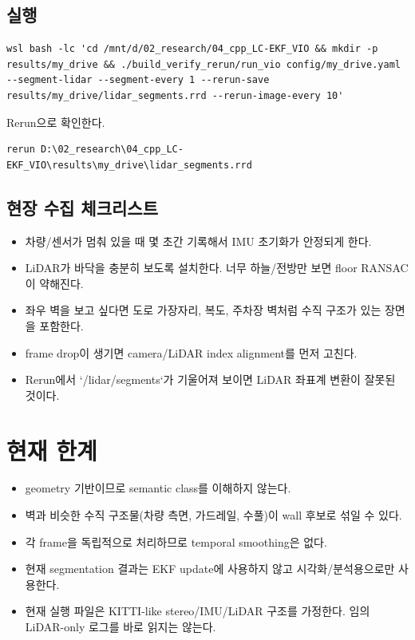 \documentclass[11pt,a4paper,oneside]{report}
\begin{document}
\section{실행}

\begin{lstlisting}
wsl bash -lc 'cd /mnt/d/02_research/04_cpp_LC-EKF_VIO && mkdir -p results/my_drive && ./build_verify_rerun/run_vio config/my_drive.yaml --segment-lidar --segment-every 1 --rerun-save results/my_drive/lidar_segments.rrd --rerun-image-every 10'
\end{lstlisting}

Rerun으로 확인한다.

\begin{lstlisting}
rerun D:\02_research\04_cpp_LC-EKF_VIO\results\my_drive\lidar_segments.rrd
\end{lstlisting}

\section{현장 수집 체크리스트}

\begin{itemize}[leftmargin=2em]
\item 차량/센서가 멈춰 있을 때 몇 초간 기록해서 IMU 초기화가 안정되게 한다.
\item LiDAR가 바닥을 충분히 보도록 설치한다. 너무 하늘/전방만 보면 floor RANSAC이 약해진다.
\item 좌우 벽을 보고 싶다면 도로 가장자리, 복도, 주차장 벽처럼 수직 구조가 있는 장면을 포함한다.
\item frame drop이 생기면 camera/LiDAR index alignment를 먼저 고친다.
\item Rerun에서 `/lidar/segments`가 기울어져 보이면 LiDAR 좌표계 변환이 잘못된 것이다.
\end{itemize}

\chapter{현재 한계}

\begin{itemize}[leftmargin=2em]
\item geometry 기반이므로 semantic class를 이해하지 않는다.
\item 벽과 비슷한 수직 구조물(차량 측면, 가드레일, 수풀)이 wall 후보로 섞일 수 있다.
\item 각 frame을 독립적으로 처리하므로 temporal smoothing은 없다.
\item 현재 segmentation 결과는 EKF update에 사용하지 않고 시각화/분석용으로만 사용한다.
\item 현재 실행 파일은 KITTI-like stereo/IMU/LiDAR 구조를 가정한다. 임의 LiDAR-only 로그를 바로 읽지는 않는다.
\end{itemize}
\end{document}
